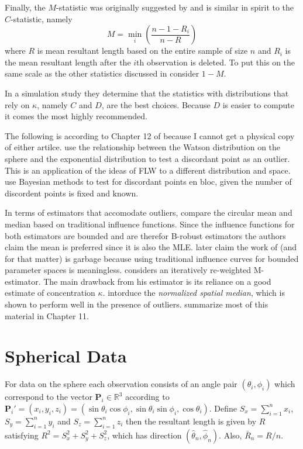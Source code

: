 \documentclass{article}\usepackage{graphicx, color}
\newcommand{\R}{{\mathbb{R}}}
\begin{document}
Finally, the $M$-statistic was originally suggested by \cite{mardia1975} and is similar in spirit to the $C$-statistic, namely
\[
M=\min_i\left(\frac{n-1-R_i}{n-R}\right)
\]
where $R$ is mean resultant length based on the entire sample of size $n$ and $R_i$ is the mean resultant length after the $i$th observation is deleted.  To put this on the same scale as the other statistics discussed in \cite{collett1980} consider $1-M$.

In a simulation study they determine that the statistics with distributions that rely on $\kappa$, namely $C$ and $D$, are the best choices.  Because $D$ is easier to compute it comes the most highly recommended.

The following is according to Chapter 12 of \cite{mardia2009} because I cannot get a physical copy of either artilce.   \cite{best1986} use the relationship between the Watson distribution on the sphere and the exponential distribution to test a discordant point as an outlier.  This is an application of the ideas of FLW to a different distribution and space. \cite{bagchi1990} use Bayesian methods to test for discordant points en bloc, given the number of discordent points is fixed and known.  

In terms of estimators that accomodate outliers,  \cite{wehrly1981} compare the circular mean and median based on traditional influence functions.  Since the influence functions for both estimators are bounded and are therefor B-robust estimators the authors claim the mean is preferred since it is also the MLE. \cite{ko1988} later claim the work of \cite{wehrly1981} (and \cite{watson1983} for that matter) is garbage because using traditional influence curves for bounded parameter spaces is meaningless.  \cite{lenth1981} considers an iteratively re-weighted M-estimator.  The main drawback from his estimator is its reliance on a good estimate of concentration $\kappa$.  \cite{ducharme1987} intorduce the {\it normalized spatial median}, which is shown to perform well in the presence of outliers.  \cite{barnett1994} summarize most of this material in Chapter 11.


\section{Spherical Data}\label{sec:sphere}

For data on the sphere each observation consists of an angle pair $(\theta_i,\phi_i)$ which correspond to the vector $\bm P_i\in \R^3$ according to $\bm P_i'=(x_i,y_i,z_i)=(\sin\theta_i\cos\phi_i,\sin\theta_i\sin\phi_i,\cos\theta_i)$.  Define $S_x=\sum_{i=1}^nx_i$, $S_y=\sum_{i=1}^ny_i$ and $S_z=\sum_{i=1}^nz_i$ then the resultant length is given by $R$ satisfying $R^2=S_x^2+S_y^2+S_z^2$, which has direction $(\hat\theta_n,\hat\phi_n)$.  Also, $\bar{R}_n=R/n$.
\end{document}
